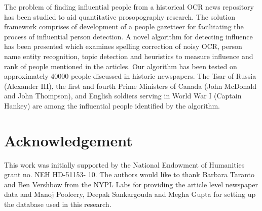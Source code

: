The problem of finding influential people from a historical OCR news repository has been studied to aid quantitative prosopography research. The solution framework comprises of development of a people gazetteer for facilitating the process of influential person detection. A novel algorithm for detecting influence has been presented which examines spelling correction of noisy OCR, person name entity recognition, topic detection and heuristics to measure influence and rank of people mentioned in the articles. Our algorithm has been tested on approximately 40000 people discussed in historic newspapers. The Tsar of Russia (Alexander III), the first and fourth Prime Ministers of Canada (John McDonald and John Thompson), and English soldiers serving in World War I (Captain Hankey) are among the influential people identified by the algorithm.



\section{Acknowledgement}
This work was initially supported by the National Endowment of Humanities grant no. NEH HD-51153- 10. The authors would like to thank Barbara Taranto and Ben Vershbow from the NYPL Labs for providing the article level newspaper data and Manoj Pooleery, Deepak Sankargouda and Megha Gupta for setting up the database used in this research.

